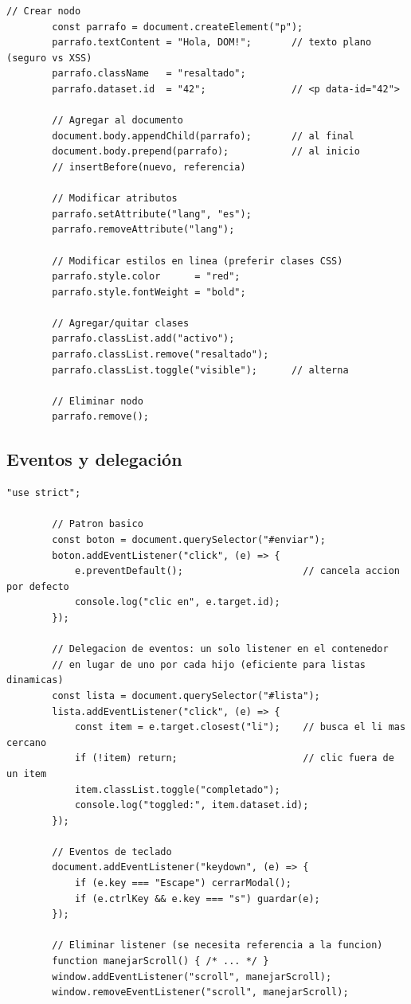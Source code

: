 \documentclass[11pt,a4paper,openany]{book}
\begin{document}
	\begin{lstlisting}[style=js,numbers=none,caption={Crear, modificar y eliminar nodos},
		label=lst:4.11]
		// Crear nodo
		const parrafo = document.createElement("p");
		parrafo.textContent = "Hola, DOM!";       // texto plano (seguro vs XSS)
		parrafo.className   = "resaltado";
		parrafo.dataset.id  = "42";               // <p data-id="42">
		
		// Agregar al documento
		document.body.appendChild(parrafo);       // al final
		document.body.prepend(parrafo);           // al inicio
		// insertBefore(nuevo, referencia)
		
		// Modificar atributos
		parrafo.setAttribute("lang", "es");
		parrafo.removeAttribute("lang");
		
		// Modificar estilos en linea (preferir clases CSS)
		parrafo.style.color      = "red";
		parrafo.style.fontWeight = "bold";
		
		// Agregar/quitar clases
		parrafo.classList.add("activo");
		parrafo.classList.remove("resaltado");
		parrafo.classList.toggle("visible");      // alterna
		
		// Eliminar nodo
		parrafo.remove();
	\end{lstlisting}
	
	\subsection{Eventos y delegación}
	\label{sub:4.eventos}
	
	\begin{lstlisting}[style=js,caption={Eventos con addEventListener y delegación},
		label=lst:4.12]
		"use strict";
		
		// Patron basico
		const boton = document.querySelector("#enviar");
		boton.addEventListener("click", (e) => {
			e.preventDefault();                     // cancela accion por defecto
			console.log("clic en", e.target.id);
		});
		
		// Delegacion de eventos: un solo listener en el contenedor
		// en lugar de uno por cada hijo (eficiente para listas dinamicas)
		const lista = document.querySelector("#lista");
		lista.addEventListener("click", (e) => {
			const item = e.target.closest("li");    // busca el li mas cercano
			if (!item) return;                      // clic fuera de un item
			item.classList.toggle("completado");
			console.log("toggled:", item.dataset.id);
		});
		
		// Eventos de teclado
		document.addEventListener("keydown", (e) => {
			if (e.key === "Escape") cerrarModal();
			if (e.ctrlKey && e.key === "s") guardar(e);
		});
		
		// Eliminar listener (se necesita referencia a la funcion)
		function manejarScroll() { /* ... */ }
		window.addEventListener("scroll", manejarScroll);
		window.removeEventListener("scroll", manejarScroll);
	\end{lstlisting}
	
\end{document}
